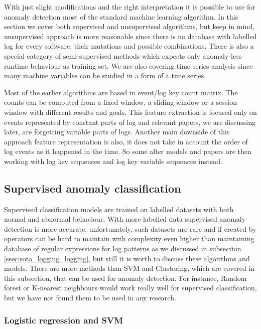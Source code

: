With just slight modifications and the right interpretation it is possible to use for anomaly detection most of the standard machine learning algorithm. In this section we cover both supervised and unsupervised algorithms, but keep in mind, unsupervised approach is more reasonable since there is no database with labelled log for every software, their mutations and possible combinations. There is also a special category of semi-supervised methods which expects only anomaly-less runtime behaviour as training set. We are also covering time series analysis since many machine variables can be studied in a form of a time series.

Most of the earlier algorithms are based in event/log key count matrix. The counts can be computed from a fixed window, a sliding window or a session window with different results and goals. This feature extraction is focused only on events represented by constant parts of log and relevant papers, we are discussing later, are forgetting variable parts of logs. Another main downside of this approach feature representation is also, it does not take in account the order of log events as it happened in the time. So some alter models and papers are then working with log key sequences and log key variable sequences instead.

\subsection{Supervised anomaly classification}

Supervised classification models are trained on labelled datasets with both normal and abnormal behaviour.  With more labelled data supervised anomaly detection is more accurate, unfortunately, such datasets are rare and if created by operators can be hard to maintain with complexity even higher than maintaining database of regular expressions for log patterns as we discussed in subsection \ref{ssec:sota_logging_logging}, but still it is worth to discuss these algorithms and models.
There are more methods than SVM and Clustering, which are covered in this subsection, that can be used for anomaly detection. For instance, Random forest or K-nearest neighbours would work really well for supervised classification, but we have not found them to be used in any research.

\subsubsection{Logistic regression and SVM}

